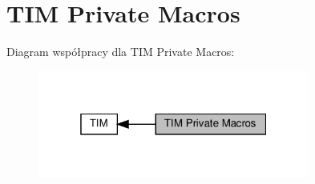 \hypertarget{group___t_i_m___private___macros}{}\section{T\+IM Private Macros}
\label{group___t_i_m___private___macros}
Diagram współpracy dla T\+IM Private Macros\+:\nopagebreak
\begin{figure}[H]
\begin{center}
\leavevmode
\includegraphics[width=253pt]{group___t_i_m___private___macros}
\end{center}
\end{figure}
